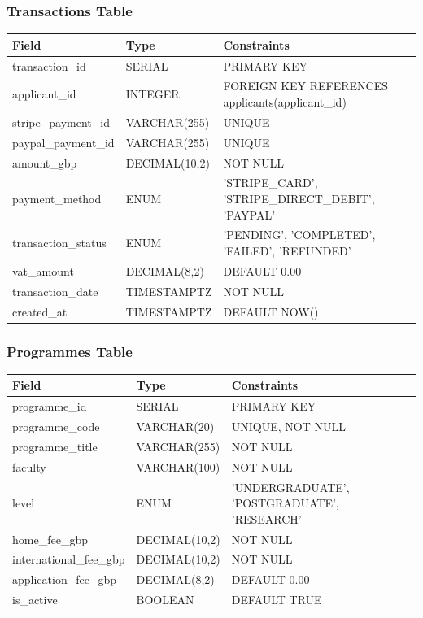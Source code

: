 \documentclass[11pt]{article}
\begin{document}
\subsubsection*{Transactions Table}
\begin{tabular}{|l|l|l|}
    \hline
    \textbf{Field} & \textbf{Type} & \textbf{Constraints} \\
    \hline
    transaction\_id & SERIAL & PRIMARY KEY \\
    applicant\_id & INTEGER & FOREIGN KEY REFERENCES applicants(applicant\_id) \\
    stripe\_payment\_id & VARCHAR(255) & UNIQUE \\
    paypal\_payment\_id & VARCHAR(255) & UNIQUE \\
    amount\_gbp & DECIMAL(10,2) & NOT NULL \\
    payment\_method & ENUM & 'STRIPE\_CARD', 'STRIPE\_DIRECT\_DEBIT', 'PAYPAL' \\
    transaction\_status & ENUM & 'PENDING', 'COMPLETED', 'FAILED', 'REFUNDED' \\
    vat\_amount & DECIMAL(8,2) & DEFAULT 0.00 \\
    transaction\_date & TIMESTAMPTZ & NOT NULL \\
    created\_at & TIMESTAMPTZ & DEFAULT NOW() \\
    \hline
\end{tabular}
\label{tab:transactions_schema}
\vspace{1em}

\subsubsection*{Programmes Table}
\begin{tabular}{|l|l|l|}
    \hline
    \textbf{Field} & \textbf{Type} & \textbf{Constraints} \\
    \hline
    programme\_id & SERIAL & PRIMARY KEY \\
    programme\_code & VARCHAR(20) & UNIQUE, NOT NULL \\
    programme\_title & VARCHAR(255) & NOT NULL \\
    faculty & VARCHAR(100) & NOT NULL \\
    level & ENUM & 'UNDERGRADUATE', 'POSTGRADUATE', 'RESEARCH' \\
    home\_fee\_gbp & DECIMAL(10,2) & NOT NULL \\
    international\_fee\_gbp & DECIMAL(10,2) & NOT NULL \\
    application\_fee\_gbp & DECIMAL(8,2) & DEFAULT 0.00 \\
    is\_active & BOOLEAN & DEFAULT TRUE \\
    \hline
\end{tabular}
\label{tab:programmes_schema}
\vspace{1em}
\end{document}
